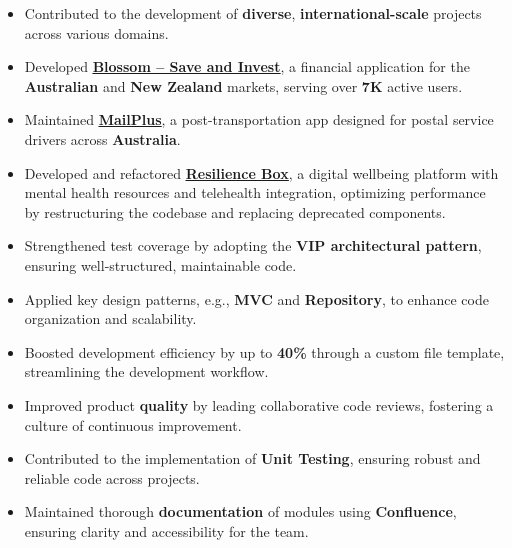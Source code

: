 \documentclass[letter,10pt]{article}
\newcommand{\customsquare}{\raisebox{0.25ex}{\scalebox{0.45}{$\blacksquare$}}}
\begin{document}
\begin{itemize}[label={\customsquare}]
    \item Contributed to the development of \textbf{diverse}, \textbf{international-scale} projects across various domains.
    \item Developed \href{https://www.blossomapp.com}{\underline{\textbf{Blossom -- Save and Invest}}}, a financial application for the \textbf{Australian} and \textbf{New Zealand} markets, serving over \textbf{7K} active users.
    \item Maintained \href{https://mailplus.com.au}{\underline{\textbf{MailPlus}}}, a post-transportation app designed for postal service drivers across \textbf{Australia}.
    \item Developed and refactored \href{https://app.resiliencebox.com}{\underline{\textbf{Resilience Box}}}, a digital wellbeing platform with mental health resources and telehealth integration, optimizing performance by restructuring the codebase and replacing deprecated components.
    \item Strengthened test coverage by adopting the \textbf{VIP architectural pattern}, ensuring well-structured, maintainable code.
    \item Applied key design patterns, e.g., \textbf{MVC} and \textbf{Repository}, to enhance code organization and scalability.
    \item Boosted development efficiency by up to \textbf{40\%} through a custom file template, streamlining the development workflow.
    \item Improved product \textbf{quality} by leading collaborative code reviews, fostering a culture of continuous improvement.
    \item Contributed to the implementation of \textbf{Unit Testing}, ensuring robust and reliable code across projects.
    \item Maintained thorough \textbf{documentation} of modules using \textbf{Confluence}, ensuring clarity and accessibility for the team.
\end{itemize}

\end{document}
